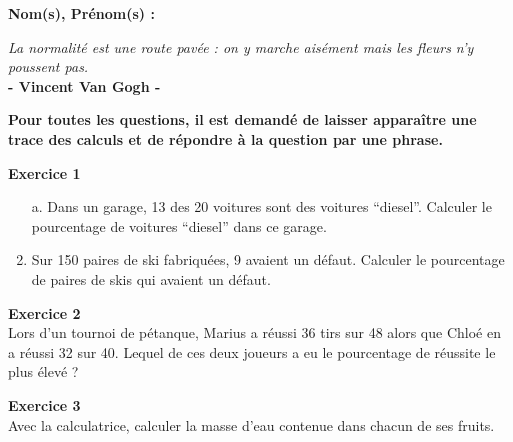 \documentclass[12pt]{article}
\newcommand{\Pointille}[1][3]{\multido{}{#1}{    \makebox[\linewidth]{\dotfill}\\[\parskip]}}
\begin{document}
\setlength{\columnseprule}{1pt}


\textbf{Nom(s), Prénom(s) :}

\begin{center}
  \textit{La normalité est une route pavée : on y marche aisément mais les fleurs n'y poussent pas.}\\ \textbf{- Vincent Van Gogh -}
\end{center}

\textbf{Pour toutes les questions, il est demandé de laisser apparaître une trace des calculs et de répondre à la question par une phrase.}


\textbf{Exercice 1}

\begin{multicols}{2}

  \begin{enumerate}
  \item[a.] Dans un garage, 13 des 20 voitures sont des voitures ``diesel''. Calculer le pourcentage de voitures ``diesel'' dans ce garage.\\
    \Pointille[5]
  \item Sur 150 paires de ski fabriquées, 9 avaient un défaut. Calculer le pourcentage de paires de skis qui avaient un défaut.\\
    \Pointille[5]
  \end{enumerate}

\end{multicols}


\begin{multicols}{2}

  \textbf{Exercice 2}\\
  Lors d'un tournoi de pétanque, Marius a réussi 36 tirs sur 48 alors que Chloé en a réussi 32 sur 40. Lequel de ces deux joueurs a eu le pourcentage de réussite le plus élevé ?\\ \vspace{0.5cm}
  \Pointille[7]

\end{multicols}

\textbf{Exercice 3}\\
Avec la calculatrice, calculer la masse d'eau contenue dans chacun de ses fruits.
\end{document}
